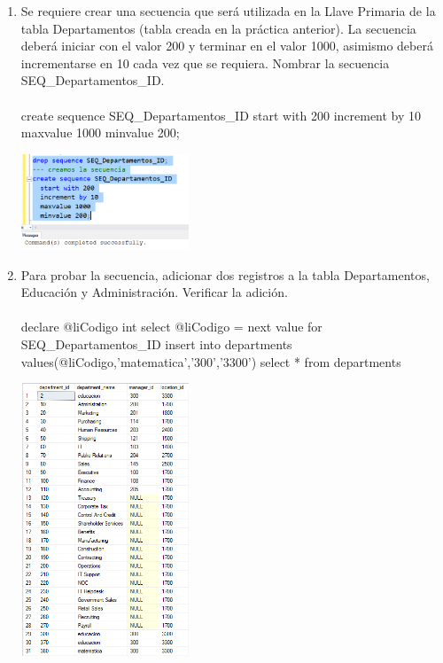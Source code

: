 \begin{enumerate}[1.]
	

	\item Se requiere crear una secuencia que será utilizada en la Llave Primaria de la tabla Departamentos (tabla creada en la práctica anterior). La secuencia deberá iniciar con el valor 200 y terminar en el valor 1000, asimismo deberá incrementarse en 10 cada vez que se requiera. Nombrar la secuencia SEQ\_Departamentos\_ID.
	\\ \\ create sequence SEQ\_Departamentos\_ID start with 200 increment by 10 maxvalue 1000 minvalue 200;	
	
	\begin{center}
	\includegraphics[width=5cm]{./Imagenes/actividad_03_05} 
	\end{center}

	\item Para probar la secuencia, adicionar dos registros a la tabla Departamentos, Educación y Administración. Verificar la adición.
	\\ \\ declare @liCodigo int select @liCodigo = next value for SEQ\_Departamentos\_ID insert into departments  values(@liCodigo,'matematica','300','3300') select * from departments

	\begin{center}
	\includegraphics[width=5cm]{./Imagenes/actividad_03_06} 
	\end{center}


\end{enumerate}
